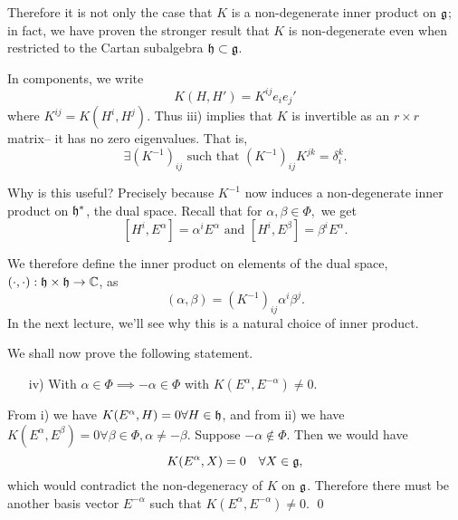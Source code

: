 Therefore it is not only the case that $K$ is a non-degenerate inner product on $\mathfrak{g}$; in fact, we have proven the stronger result that $K$ is non-degenerate even when restricted to the Cartan subalgebra $\mathfrak{h}\subset \mathfrak{g}$.

In components, we write
$$K(H,H')=K^{ij}e_i e_j'$$ where $K^{ij}=K(H^i,H^j)$. Thus iii) implies that $K$ is invertible as an $r\times r$ matrix-- it has no zero eigenvalues. That is,
$$\exists(K^{-1})_{ij}\text{ such that }(K^{-1})_{ij} K^{jk}=\delta_i^k.$$

Why is this useful? Precisely because $K^{-1}$ now induces a non-degenerate inner product on $\mathfrak{h}^*$, the dual space. Recall that for $\alpha,\beta\in \Phi,$ we get
$$[H^i,E^\alpha]=\alpha^i E^\alpha\text{ and }[H^i,E^\beta]=\beta^i E^\alpha.$$
\begin{defn}
We therefore define the inner product on elements of the dual space, $(\cdot,\cdot):\mathfrak{h}\times \mathfrak{h} \to \mathbb{C}$, as
$$(\alpha,\beta)=(K^{-1})_{ij}\alpha^i \beta^j.$$
In the next lecture, we'll see why this is a natural choice of inner product.
\end{defn}

We shall now prove the following statement.
\begin{itemize}
\item[iv)] With $\alpha\in \Phi\implies -\alpha\in \Phi$ with
$K(E^\alpha,E^{-\alpha})\neq 0.$
\end{itemize}
From i) we have $K(E^\alpha,H)=0\forall H\in \mathfrak{h}$, and from ii) we have $K(E^\alpha,E^\beta)=0 \forall \beta\in \Phi, \alpha\neq -\beta$. Suppose $-\alpha \notin \Phi$. Then we would have
$$K(E^\alpha,X)=0\quad \forall X\in \mathfrak{g},$$
which would contradict the non-degeneracy of $K$ on $\mathfrak{g}$. Therefore there must be another basis vector $E^{-\alpha}$ such that $K(E^\alpha,E^{-\alpha})\neq 0$. \qed

